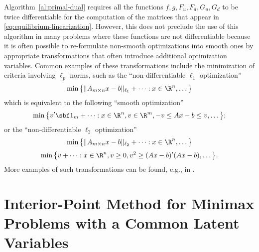 \documentclass[11pt]{article}
\begin{document}
\begin{remark}[Smoothness]
  Algorithm~\ref{al:primal-dual} requires all the functions
  $f,g,F_u,F_d,G_u,G_d$ to be twice differentiable for the computation
  of the matrices that appear in
  \eqref{eq:equilibrium-linearization}. However, this does not
  preclude the use of this algorithm in many problems where these
  functions are not differentiable because it is often possible to
  re-formulate non-smooth optimizations into smooth ones by
  appropriate transformations that often introduce additional
  optimization variables. Common examples of these transformations
  include the minimization of criteria involving $\ell_p$ norms, such as
  the ``non-differentiable $\ell_1$ optimization''
  \begin{align*}
    \min \big\{ \|A_{m\times n}x-b\|_{\ell_1}+\cdots: x\in\R^n,\dots \big\}
  \end{align*}
  which is equivalent to the following ``smooth optimization''
  \begin{align*}
    \min \big\{v'\sbf 1_m +\cdots:x\in\R^n,v\in\R^m, -v\le Ax-b\le v,\dots\big\};
  \end{align*}
  or the ``non-differentiable $\ell_2$ optimization''
  \begin{align*}
    \min \big\{\|A_{m\times n}x-b\|_{\ell_2}+\cdots: x\in\R^n,\dots\big\}
  \end{align*}
  \begin{align*}
    \min \big\{v +\cdots:x\in\R^n,v\ge0, v^2\ge (Ax-b)'(Ax-b),\dots \big\}.
  \end{align*}
  More examples of such transformations can be found, e.g., in
  \cite{GrantBoyd2008}. \frqed
\end{remark}

\section{Interior-Point Method for Minimax Problems with a Common Latent Variables}
\label{sec:ipm-latent}
\end{document}
